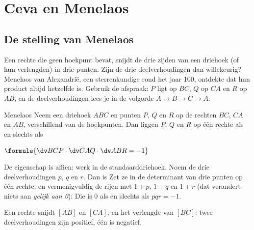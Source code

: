 \section{Ceva en Menelaos}

\subsection{De stelling van Menelaos}

Een rechte die geen hoekpunt bevat, snijdt de drie zijden van een driehoek (of hun verlengden) in drie punten. Zijn de drie deelverhoudingen dan willekeurig? Menelaos van Alexandrië, een sterrenkundige rond het jaar 100, ontdekte dat hun product altijd hetzelfde is. Gebruik de afspraak: $P$ ligt op $BC$, $Q$ op $CA$ en $R$ op $AB$, en de deelverhoudingen lees je in de volgorde $A \to B \to C \to A$.

\begin{theorie}
\begin{stelling}{Menelaos}
Neem een driehoek $ABC$ en punten $P$, $Q$ en $R$ op de rechten $BC$, $CA$ en $AB$, verschillend van de hoekpunten. Dan liggen $P$, $Q$ en $R$ op één rechte als en slechts als

\vspace{1mm}
\qquad $\formule{\dv BCP \cdot \dv CAQ \cdot \dv ABR = -1}$
\end{stelling}

\begin{bewijs}
De eigenschap is affien: werk in de standaarddriehoek. Noem de drie deelverhoudingen $p$, $q$ en $r$. Dan is
Zet ze in de determinant van drie punten op één rechte, en vermenigvuldig de rijen met $1 + p$, $1 + q$ en $1 + r$ (dat verandert niets aan \textit{gelijk aan 0}):
Die is 0 als en slechts als $pqr = -1$.
\end{bewijs}
\end{theorie}

\begin{center}\small Een rechte snijdt $[AB]$ en $[CA]$, en het verlengde van $[BC]$: twee deelverhoudingen zijn positief, één is negatief.\end{center}

